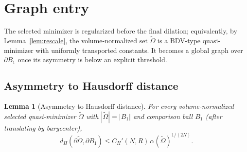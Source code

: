 \documentclass[11pt]{article}
\newtheorem{lemma}[theorem]{Lemma}
\theoremstyle{definition}
\newcommand{\abs}[1]{\left|#1\right|}
\begin{document}
\section{Graph entry}\label{sec:graphentry}

The selected minimizer is regularized before the final dilation; equivalently,
by Lemma~\ref{lem:rescale}, the volume-normalized set
$\widetilde\Omega$ is a BDV-type quasi-minimizer with uniformly transported
constants. It becomes a global graph over $\partial B_1$ once its asymmetry is
below an explicit threshold.

\subsection{Asymmetry to Hausdorff distance}

\begin{lemma}[Asymmetry to Hausdorff distance]\label{lem:alphaH}
For every volume-normalized selected quasi-minimizer $\widetilde\Omega$ with
$\abs{\widetilde\Omega}=\abs{B_1}$ and comparison ball $B_1$ (after
translating by barycenter),
\[
d_H(\partial\widetilde\Omega,\partial B_1)
\le C_H'(N,R)\,\alpha(\widetilde\Omega)^{1/(2N)}.
\]
\end{lemma}
\end{document}
